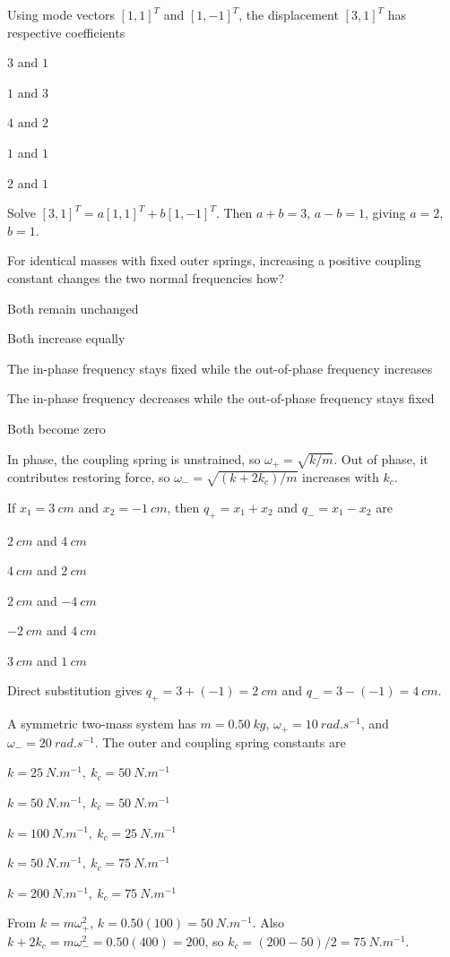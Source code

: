 \documentclass[10pt,a4paper,full]{physicsquiz}
\newcommand{\bankq}[9]{%
  \begin{quizquestion}[
    id=#1,
    topic={#2},
    difficulty=#3,
    marks=1,
    correct=#4,
    tags={#5},
    outcome={#6}
  ]
    #7
    \begin{choiceoptions}
      #8
    \end{choiceoptions}
  \end{quizquestion}
  \begin{quizsolution}
    #9
  \end{quizsolution}
}
\begin{document}
\begin{quizbank}
\bankq{modes-040}{Normal Modes}{applied}{E}{normal-modes,decomposition}{Decompose an initial displacement into normal modes.}{%
Using mode vectors \([1,1]^T\) and \([1,-1]^T\), the displacement \([3,1]^T\) has respective coefficients}{%
\item \(3\) and \(1\)
\item \(1\) and \(3\)
\item \(4\) and \(2\)
\item \(1\) and \(1\)
\item \(2\) and \(1\)}{%
Solve \([3,1]^T=a[1,1]^T+b[1,-1]^T\). Then \(a+b=3\), \(a-b=1\), giving \(a=2\), \(b=1\).}

\bankq{modes-041}{Normal Modes}{applied}{C}{normal-modes,coupling,scaling}{Predict how coupling changes mode frequencies.}{%
For identical masses with fixed outer springs, increasing a positive coupling constant changes the two normal frequencies how?}{%
\item Both remain unchanged
\item Both increase equally
\item The in-phase frequency stays fixed while the out-of-phase frequency increases
\item The in-phase frequency decreases while the out-of-phase frequency stays fixed
\item Both become zero}{%
In phase, the coupling spring is unstrained, so \(\omega_+=\sqrt{k/m}\). Out of phase, it contributes restoring force, so \(\omega_-=\sqrt{(k+2k_c)/m}\) increases with \(k_c\).}

\bankq{modes-042}{Normal Modes}{applied}{A}{normal-modes,coordinates}{Use normal coordinates.}{%
If \(x_1=\SI{3}{cm}\) and \(x_2=-\SI{1}{cm}\), then \(q_+=x_1+x_2\) and \(q_-=x_1-x_2\) are}{%
\item \(\SI{2}{cm}\) and \(\SI{4}{cm}\)
\item \(\SI{4}{cm}\) and \(\SI{2}{cm}\)
\item \(\SI{2}{cm}\) and \(\SI{-4}{cm}\)
\item \(\SI{-2}{cm}\) and \(\SI{4}{cm}\)
\item \(\SI{3}{cm}\) and \(\SI{1}{cm}\)}{%
Direct substitution gives \(q_+=3+(-1)=\SI{2}{cm}\) and \(q_-=3-(-1)=\SI{4}{cm}\).}

\bankq{modes-043}{Normal Modes}{challenge}{D}{normal-modes,inverse-problem}{Infer spring constants from measured mode frequencies.}{%
A symmetric two-mass system has \(m=\SI{0.50}{kg}\), \(\omega_+=\SI{10}{rad.s^{-1}}\), and \(\omega_-=\SI{20}{rad.s^{-1}}\). The outer and coupling spring constants are}{%
\item \(k=\SI{25}{N.m^{-1}},\ k_c=\SI{50}{N.m^{-1}}\)
\item \(k=\SI{50}{N.m^{-1}},\ k_c=\SI{50}{N.m^{-1}}\)
\item \(k=\SI{100}{N.m^{-1}},\ k_c=\SI{25}{N.m^{-1}}\)
\item \(k=\SI{50}{N.m^{-1}},\ k_c=\SI{75}{N.m^{-1}}\)
\item \(k=\SI{200}{N.m^{-1}},\ k_c=\SI{75}{N.m^{-1}}\)}{%
From \(k=m\omega_+^2\), \(k=0.50(100)=\SI{50}{N.m^{-1}}\). Also \(k+2k_c=m\omega_-^2=0.50(400)=200\), so \(k_c=(200-50)/2=\SI{75}{N.m^{-1}}\).}


\end{quizbank}
\end{document}
